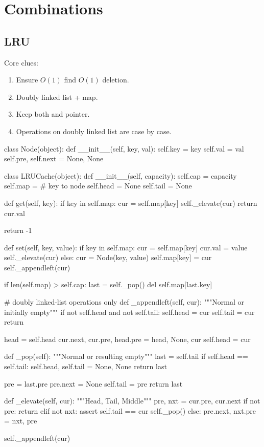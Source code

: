 \section{Combinations}
\subsection{LRU}
Core clues:
\begin{enumerate}
\item Ensure $O(1)$ find $O(1)$ deletion. 
\item Doubly linked list + map.
\item Keep both  and  pointer.
\item Operations on doubly linked list are case by case.  
\end{enumerate}
\begin{python}
class Node(object):
    def __init__(self, key, val):
        self.key = key
        self.val = val
        self.pre, self.next = None, None


class LRUCache(object):
    def __init__(self, capacity):
        self.cap = capacity
        self.map = {}  # key to node
        self.head = None
        self.tail = None

    def get(self, key):
        if key in self.map:
            cur = self.map[key]
            self._elevate(cur)
            return cur.val

        return -1

    def set(self, key, value):
        if key in self.map:
            cur = self.map[key]
            cur.val = value
            self._elevate(cur)
        else:
            cur = Node(key, value)
            self.map[key] = cur
            self._appendleft(cur)

            if len(self.map) > self.cap:
                last = self._pop()
                del self.map[last.key]

    # doubly linked-list operations only
    def _appendleft(self, cur):
        """Normal or initially empty"""
        if not self.head and not self.tail:
            self.head = cur
            self.tail = cur
            return

        head = self.head
        cur.next, cur.pre, head.pre = head, None, cur
        self.head = cur

    def _pop(self):
        """Normal or resulting empty"""
        last = self.tail
        if self.head == self.tail:
            self.head, self.tail = None, None
            return last

        pre = last.pre
        pre.next = None
        self.tail = pre
        return last

    def _elevate(self, cur):
        """Head, Tail, Middle"""
        pre, nxt = cur.pre, cur.next
        if not pre:
            return
        elif not nxt:
            assert self.tail == cur
            self._pop()
        else:
            pre.next, nxt.pre = nxt, pre

        self._appendleft(cur)
\end{python}
